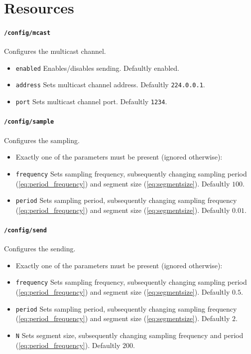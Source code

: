 \section*{Resources}

\paragraph{\texttt{/config/mcast}}
Configures the multicast channel.
\begin{itemize}
    \item[] \texttt{enabled} Enables/disables sending. Defaultly enabled.
    \item[] \texttt{address} Sets multicast channel address. Defaultly \texttt{224.0.0.1}.
    \item[] \texttt{port}    Sets multicast channel port. Defaultly \texttt{1234}.
\end{itemize}

\paragraph{\texttt{/config/sample}}
Configures the sampling.
\begin{itemize}
    \item[] Exactly one of the parameters must be present (ignored otherwise):
    \item[] \texttt{frequency} Sets sampling frequency, subsequently changing sampling period (\ref{eq:period_frequency}) and segment size (\ref{eq:segmentsize}). Defaultly $100$.
    \item[] \texttt{period}    Sets sampling period, subsequently changing sampling frequency (\ref{eq:period_frequency}) and segment size (\ref{eq:segmentsize}). Defaultly $0.01$.
\end{itemize}

\paragraph{\texttt{/config/send}}
Configures the sending.
\begin{itemize}
    \item[] Exactly one of the parameters must be present (ignored otherwise):
    \item[] \texttt{frequency} Sets sampling frequency, subsequently changing sampling period (\ref{eq:period_frequency}) and segment size (\ref{eq:segmentsize}). Defaultly $0.5$.
    \item[] \texttt{period}    Sets sampling period, subsequently changing sampling frequency (\ref{eq:period_frequency}) and segment size (\ref{eq:segmentsize}). Defaultly $2$.
    \item[] \texttt{N}         Sets segment size, subsequently changing sampling frequency and period (\ref{eq:period_frequency}). Defaultly $200$.
\end{itemize}

